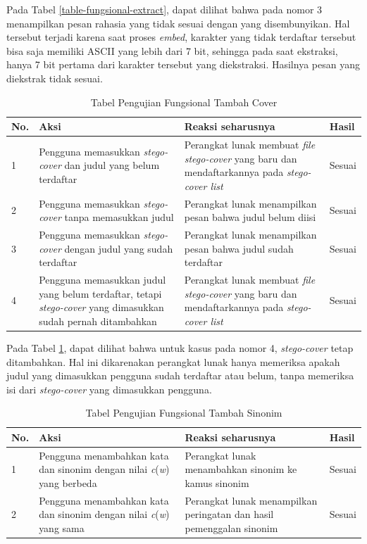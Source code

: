 Pada Tabel \ref{table-fungsional-extract}, dapat dilihat bahwa pada nomor 3 menampilkan pesan rahasia yang tidak sesuai dengan yang disembunyikan. Hal tersebut terjadi karena saat proses \textit{embed}, karakter yang tidak terdaftar tersebut bisa saja memiliki ASCII yang lebih dari 7 bit, sehingga pada saat ekstraksi, hanya 7 bit pertama dari karakter tersebut yang diekstraksi. Hasilnya pesan yang diekstrak tidak sesuai. 

\begin{table}[H]
\label{table-fungsional-tambah-cover}
\centering
\caption{Tabel Pengujian Fungsional Tambah Cover}
\begin{tabular}{|p{0.3cm} | p{4.5cm} | p{7cm} | p{2.5cm} |}\hline
No. & Aksi & Reaksi seharusnya & Hasil\\
\hline
1 & Pengguna memasukkan \textit{stego-cover} dan judul yang belum terdaftar & Perangkat lunak membuat \textit{file stego-cover} yang baru dan mendaftarkannya pada \textit{stego-cover list} & Sesuai\\
2 & Pengguna memasukkan \textit{stego-cover} tanpa memasukkan judul & Perangkat lunak menampilkan pesan bahwa judul belum diisi & Sesuai \\
3 & Pengguna memasukkan \textit{stego-cover} dengan judul yang sudah terdaftar & Perangkat lunak menampilkan pesan bahwa judul sudah terdaftar & Sesuai \\
4 & Pengguna memasukkan judul yang belum terdaftar, tetapi \textit{stego-cover} yang dimasukkan sudah pernah ditambahkan & Perangkat lunak membuat \textit{file stego-cover} yang baru dan mendaftarkannya pada \textit{stego-cover list} & Sesuai \\
\hline
\end{tabular}
\end{table}

Pada Tabel \ref{table-fungsional-tambah-cover}, dapat dilihat bahwa untuk kasus pada nomor 4, \textit{stego-cover} tetap ditambahkan. Hal ini dikarenakan perangkat lunak hanya memeriksa apakah judul yang dimasukkan pengguna sudah terdaftar atau belum, tanpa memeriksa isi dari \textit{stego-cover} yang dimasukkan pengguna.

\begin{table}[H]
\label{table-fungsional-tambah-sinonim}
\centering
\caption{Tabel Pengujian Fungsional Tambah Sinonim}
\begin{tabular}{|p{0.3cm} | p{4.5cm} | p{7cm} | p{2.5cm} |}\hline
No. & Aksi & Reaksi seharusnya & Hasil \\
\hline
1 & Pengguna menambahkan kata dan sinonim dengan nilai \textit{c}(\textit{w}) yang berbeda & Perangkat lunak menambahkan sinonim ke kamus sinonim & Sesuai \\
2 & Pengguna menambahkan kata dan sinonim dengan nilai \textit{c}(\textit{w}) yang sama & Perangkat lunak menampilkan peringatan dan hasil pemenggalan sinonim & Sesuai \\
\hline
\end{tabular}
\end{table}


